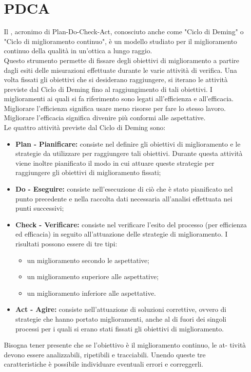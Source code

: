 \documentclass[PianoDiQualifica.tex]{subfiles}
\begin{document}
\section{PDCA}
Il , acronimo di Plan-Do-Check-Act, conosciuto anche come "Ciclo di
Deming" o "Ciclo di miglioramento continuo", è un modello studiato per il
miglioramento continuo della qualità in un’ottica a lungo raggio.\\ 
Questo strumento permette di fissare degli obiettivi di miglioramento a partire dagli esiti delle misurazioni effettuate durante le varie attività di verifica.
Una volta fissati gli obiettivi che si desiderano raggiungere, si iterano le attività previste dal Ciclo di Deming fino al raggiungimento di tali obiettivi.
I miglioramenti ai quali si fa riferimento sono legati all’efficienza e all’efficacia. Migliorare l’efficienza significa usare meno risorse per fare lo stesso
lavoro. Migliorare l’efficacia significa divenire più conformi alle aspettative.\\
Le quattro attività previste dal Ciclo di Deming sono:
\begin{itemize}
\item \textbf{Plan - Pianificare:} consiste nel definire gli obiettivi di miglioramento
e le strategie da utilizzare per raggiungere tali obiettivi. Durante questa
attività viene inoltre pianificato il modo in cui attuare queste strategie
per raggiungere gli obiettivi di miglioramento fissati;
\item \textbf{Do - Eseguire:} consiste nell'esecuzione di ciò che è stato pianificato nel punto precedente e nella raccolta dati necessaria all'analisi effettuata nei punti successivi;
\item \textbf{ Check - Verificare:} consiste nel verificare l’esito del processo (per
efficienza ed efficacia) in seguito all’attuazione delle strategie di miglioramento. I risultati possono essere di tre tipi:
\begin{itemize}
\item un miglioramento secondo le aspettative;
\item un miglioramento superiore alle aspettative;
\item un miglioramento inferiore alle aspettative.
\end{itemize}
\item \textbf{ Act - Agire:} consiste nell’attuazione di soluzioni correttive, ovvero di strategie che hanno portato miglioramenti, anche al di fuori dei singoli processi per i quali si erano stati fissati gli obiettivi di miglioramento.
\end{itemize}

Bisogna tener presente che se l’obiettivo è il miglioramento continuo, le at-
tività devono essere analizzabili, ripetibili e tracciabili. Unendo queste tre
caratteristiche è possibile individuare eventuali errori e correggerli.
\end{document}
